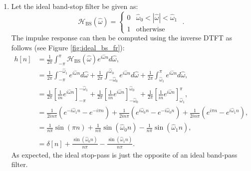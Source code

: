 \begin{enumerate}
\item Let the ideal band-stop filter be given as:
\begin{equation*}
\mathcal{H}_{\mathrm{BS}}(\hat{\omega}) = \left\{ \begin{array}{cc}
0 & \hat{\omega}_0 < |\hat{\omega}| < \hat{\omega}_1 \\
1 & \mathrm{otherwise}
\end{array}\right.\,\,.
\end{equation*}
The impulse response can then be computed using the inverse DTFT as follows (see Figure \ref{fig:ideal_bs_fr}):
\begin{align*}
    h[n]&=\frac{1}{2\pi}\int_{-\pi}^{\pi}\mathcal{H}_{\mathrm{BS}}(\hat{\omega})e^{i\hat{\omega}n}d\hat{\omega}, \\
    &=\frac{1}{2\pi}\int_{-\pi}^{-\hat{\omega}_{1}}e^{i\hat{\omega}n}d\hat{\omega} + \frac{1}{2\pi}\int_{-\hat{\omega}_{0}}^{\hat{\omega}_{0}}e^{i\hat{\omega}n}d\hat{\omega} + \frac{1}{2\pi}\int_{\hat{\omega}_{1}}^{\pi}e^{i\hat{\omega}n}d\hat{\omega}, \\
    &=\frac{1}{2\pi}\left[\frac{1}{in}e^{i\hat{\omega}n}\right]_{-\pi}^{-\hat{\omega}_{1}} + \frac{1}{2\pi}\left[\frac{1}{in}e^{i\hat{\omega}n}\right]_{-\hat{\omega}_{0}}^{\hat{\omega}_{0}} + \frac{1}{2\pi}\left[\frac{1}{in}e^{i\hat{\omega}n}\right]_{\hat{\omega}_{1}}^{\pi}, \\
    &=\frac{1}{2in\pi}\left(e^{-i\hat{\omega}_{1}n}-e^{-i\pi n}\right) + \frac{1}{2in\pi}\left(e^{i\hat{\omega}_{0}n}-e^{-i\hat{\omega}_{0}n}\right) + \frac{1}{2in\pi}\left(e^{i\pi n}-e^{i\hat{\omega}_{1}n}\right), \\
    &=\frac{1}{n\pi}\sin(\pi n) + \frac{1}{n\pi}\sin(\hat{\omega}_{0}n) - \frac{1}{n\pi}\sin(\hat{\omega}_{1}n), \\
    &=\delta[n] + \frac{\sin(\hat{\omega}_{0}n)}{n\pi} - \frac{\sin(\hat{\omega}_{1}n)}{n\pi}.
\end{align*}
As expected, the ideal stop-pass is just the opposite of an ideal band-pass filter. 



\end{enumerate}